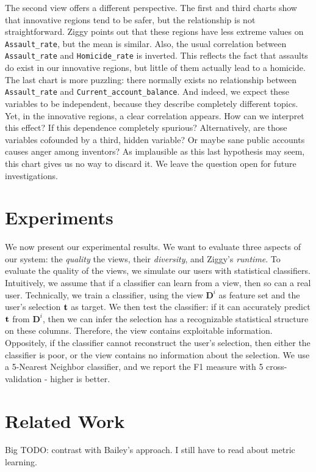 The second view offers a different perspective. The first and third charts show
that innovative regions tend to be safer, but the relationship is not
straightforward. Ziggy points out that these regions have less extreme values
on \texttt{Assault\_rate}, but the mean is similar. Also, the usual
correlation between \texttt{Assault\_rate} and \texttt{Homicide\_rate} is
inverted. This reflects the fact that assaults do exist in our innovative
regions, but little of them actually lead to a homicide. The last chart is more
puzzling: there normally exists no relationship between \texttt{Assault\_rate}
and \texttt{Current\_ac\-count\_balance}. And indeed, we expect these variables
to be independent, because they describe completely different topics. Yet,
in the innovative regions, a clear correlation appears. How can we interpret
this effect? If this dependence completely spurious? Alternatively, are those
variables cofounded by a third, hidden variable? Or maybe sane public accounts
causes anger among inventors? As implausible as this last hypothesis may seem, this
chart gives us no way to discard it. We leave the question open for future
investigations.

\section{Experiments}
\label{sec:experiments}

We now present our experimental results. We want to evaluate three aspects of
our system: the \emph{quality} the views, their \emph{diversity}, and Ziggy's
\emph{runtime}. To evaluate the quality of the views, we simulate our users with
statistical classifiers. Intuitively, we assume that if a classifier can learn from a view,
then so can a real user. Technically, we train a classifier, using
the view $\textbf{D}^i$ as feature set and the user's selection $\bf{t}$ as
target. We then test the classifier: if it can accurately predict $\bf{t}$ from
$\textbf{D}^i$, then we can infer the selection has a recognizable
statistical structure on these columns. Therefore, the view contains
exploitable information. Oppositely, if the classifier cannot reconstruct the
user's selection, then either the classifier is poor, or the view contains no
information about the selection. We use a 5-Nearest Neighbor classifier, and we
report the F1 measure with 5 cross-validation - higher is better.


\section{Related Work}
\label{sec:related-works}
{\color{red} Big TODO: contrast with Bailey's approach.
I still have to read about metric learning.}


